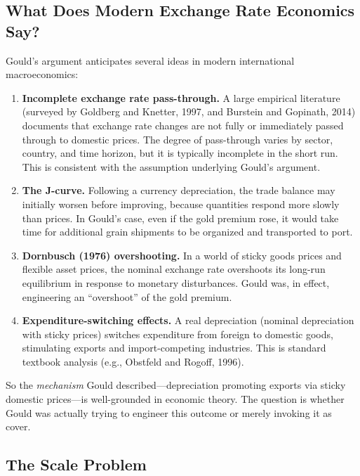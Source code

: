 \documentclass[12pt]{article}
\begin{document}
\subsection{What Does Modern Exchange Rate Economics Say?}

Gould's argument anticipates several ideas in modern international 
macroeconomics:

\begin{enumerate}
    \item \textbf{Incomplete exchange rate pass-through.} A large 
    empirical literature (surveyed by Goldberg and Knetter, 1997, and 
    Burstein and Gopinath, 2014) documents that exchange rate changes 
    are not fully or immediately passed through to domestic prices. The 
    degree of pass-through varies by sector, country, and time horizon, 
    but it is typically incomplete in the short run. This is consistent 
    with the assumption underlying Gould's argument.
    
    \item \textbf{The J-curve.} Following a currency depreciation, the 
    trade balance may initially worsen before improving, because 
    quantities respond more slowly than prices. In Gould's case, even 
    if the gold premium rose, it would take time for additional grain 
    shipments to be organized and transported to port.
    
    \item \textbf{Dornbusch (1976) overshooting.} In a world of sticky 
    goods prices and flexible asset prices, the nominal exchange rate 
    overshoots its long-run equilibrium in response to monetary 
    disturbances. Gould was, in effect, engineering an ``overshoot'' 
    of the gold premium.
    
    \item \textbf{Expenditure-switching effects.} A real depreciation 
    (nominal depreciation with sticky prices) switches expenditure from 
    foreign to domestic goods, stimulating exports and import-competing 
    industries. This is standard textbook analysis (e.g., 
    Obstfeld and Rogoff, 1996).
\end{enumerate}

So the \emph{mechanism} Gould described---depreciation promoting exports 
via sticky domestic prices---is well-grounded in economic theory. The 
question is whether Gould was actually trying to engineer this outcome 
or merely invoking it as cover.

\subsection{The Scale Problem}
\end{document}
